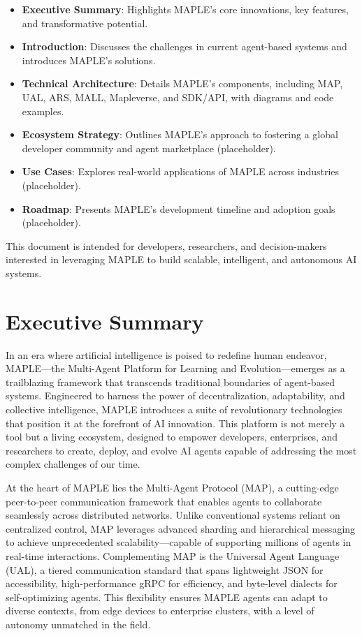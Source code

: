 \documentclass[a4paper,11pt]{article}
\begin{document}
\begin{itemize}[leftmargin=*]
    \item \textbf{Executive Summary}: Highlights MAPLE’s core innovations, key features, and transformative potential.
    \item \textbf{Introduction}: Discusses the challenges in current agent-based systems and introduces MAPLE’s solutions.
    \item \textbf{Technical Architecture}: Details MAPLE’s components, including MAP, UAL, ARS, MALL, Mapleverse, and SDK/API, with diagrams and code examples.
    \item \textbf{Ecosystem Strategy}: Outlines MAPLE’s approach to fostering a global developer community and agent marketplace (placeholder).
    \item \textbf{Use Cases}: Explores real-world applications of MAPLE across industries (placeholder).
    \item \textbf{Roadmap}: Presents MAPLE’s development timeline and adoption goals (placeholder).
\end{itemize}

This document is intended for developers, researchers, and decision-makers interested in leveraging MAPLE to build scalable, intelligent, and autonomous AI systems.

\pagebreak

\section{Executive Summary}
In an era where artificial intelligence is poised to redefine human endeavor, MAPLE—the Multi-Agent Platform for Learning and Evolution—emerges as a trailblazing framework that transcends traditional boundaries of agent-based systems. Engineered to harness the power of decentralization, adaptability, and collective intelligence, MAPLE introduces a suite of revolutionary technologies that position it at the forefront of AI innovation. This platform is not merely a tool but a living ecosystem, designed to empower developers, enterprises, and researchers to create, deploy, and evolve AI agents capable of addressing the most complex challenges of our time.

At the heart of MAPLE lies the Multi-Agent Protocol (MAP), a cutting-edge peer-to-peer communication framework that enables agents to collaborate seamlessly across distributed networks. Unlike conventional systems reliant on centralized control, MAP leverages advanced sharding and hierarchical messaging to achieve unprecedented scalability—capable of supporting millions of agents in real-time interactions. Complementing MAP is the Universal Agent Language (UAL), a tiered communication standard that spans lightweight JSON for accessibility, high-performance gRPC for efficiency, and byte-level dialects for self-optimizing agents. This flexibility ensures MAPLE agents can adapt to diverse contexts, from edge devices to enterprise clusters, with a level of autonomy unmatched in the field.
\end{document}
